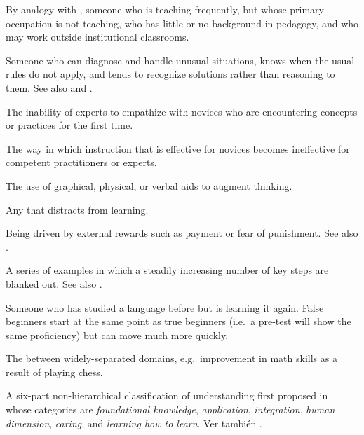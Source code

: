 \begin{description}
 By analogy with
,
someone who is teaching frequently, but whose primary occupation is not
teaching, who has little or no background in pedagogy, and who may work outside
institutional classrooms.

 Someone who can diagnose and handle unusual
situations, knows when the usual rules do not apply, and tends to recognize
solutions rather than reasoning to them. See
also 
and .

 The inability of experts to
empathize with novices who are encountering concepts or practices for the first
time.

 The way in which
instruction that is effective for novices becomes ineffective for competent
practitioners or experts.

 The use of graphical,
physical, or verbal aids to augment thinking.

 Any 
that distracts from learning.

 Being driven by external
rewards such as payment or fear of punishment. See
also .

 A series of examples in which a steadily
increasing number of key steps are blanked out. See
also .

 Someone who has studied a language
before but is learning it again. False beginners start at the same point as true
beginners (i.e.\ a pre-test will show the same proficiency) but can move much
more quickly.

 The 
between widely-separated domains, e.g.\ improvement in math skills as a result
of playing chess.

 A six-part non-hierarchical
classification of understanding first proposed in~\cite{Fink2013} whose
categories are \emph{foundational knowledge}, \emph{application},
\emph{integration}, \emph{human dimension}, \emph{caring}, and \emph{learning
  how to learn}. Ver también .


\end{description}
